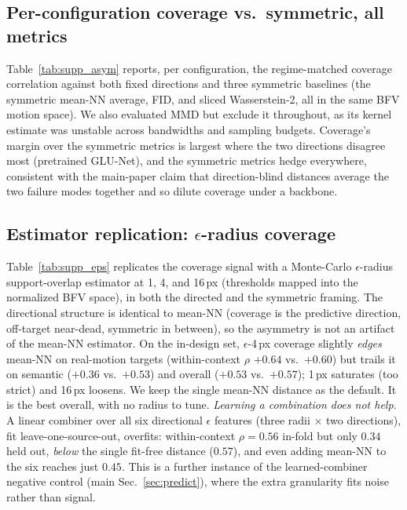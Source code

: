 \documentclass[runningheads]{llncs}
\newcommand{\dtb}{d_{S\to T}}
\newcommand{\dbt}{d_{T\to S}}
\newcommand{\enctrained}{\textcolor{orange!90!red}{\faFire}}
\newcommand{\encfrozen}{\textcolor{cyan!55!blue}{\faSnowflake[regular]}}
\begin{document}
\subsection{Per-configuration coverage vs.\ symmetric, all metrics}
Table~\ref{tab:supp_asym} reports, per configuration, the regime-matched
coverage correlation against both fixed directions and three symmetric baselines
(the symmetric mean-NN average, FID, and sliced Wasserstein-2, all in the
same BFV motion space). We also evaluated MMD but exclude it throughout, as its
kernel estimate was unstable across bandwidths and sampling budgets. Coverage's margin over the symmetric metrics is largest
where the two directions disagree most (pretrained GLU-Net), and the
symmetric metrics hedge everywhere, consistent with the main-paper claim that
direction-blind distances average the two failure modes together and so dilute
coverage under a backbone.

\begin{table}[h]
\centering
\caption{Per-configuration ranking correlations behind the coverage trend: the
regime-matched rule vs.\ the two fixed directions ($\dtb$ off-target, $\dbt$
coverage) and three symmetric baselines (mean-NN sym, FID, sliced-$W_2$), all in
BFV motion space. Encoder: \enctrained\ trained, \encfrozen\ frozen. Coverage
($\dbt$) is the consistent positive predictor under a pretrained backbone, where
the two directions disagree most; the symmetric metrics hedge everywhere.}
\label{tab:supp_asym}
\scriptsize
\setlength{\tabcolsep}{3pt}

\end{table}

\subsection{Estimator replication: $\epsilon$-radius coverage}
Table~\ref{tab:supp_eps} replicates the coverage signal with a Monte-Carlo
$\epsilon$-radius support-overlap estimator at 1, 4, and 16\,px (thresholds
mapped into the normalized BFV space), in both the directed and the symmetric
framing. The directional structure is identical to mean-NN (coverage is the
predictive direction, off-target near-dead, symmetric in between), so the
asymmetry is not an artifact of the mean-NN estimator. On the in-design set,
$\epsilon$-4\,px coverage slightly \emph{edges} mean-NN on real-motion targets
(within-context $\rho$ $+0.64$ vs.\ $+0.60$) but trails it on semantic ($+0.36$
vs.\ $+0.53$) and overall ($+0.53$ vs.\ $+0.57$); 1\,px saturates (too strict) and
16\,px loosens. We keep the single mean-NN distance as the default. It is the best overall,
with no radius to tune. \emph{Learning a combination does not
help.} A linear combiner over all six directional $\epsilon$ features (three radii
$\times$ two directions), fit leave-one-source-out, overfits: within-context
$\rho{=}0.56$ in-fold but only $0.34$ held out, \emph{below} the single fit-free
distance ($0.57$), and even adding mean-NN to the six reaches just $0.45$. This is
a further instance of the learned-combiner negative control (main
Sec.~\ref{sec:predict}), where the extra granularity fits noise rather than signal.
\end{document}
